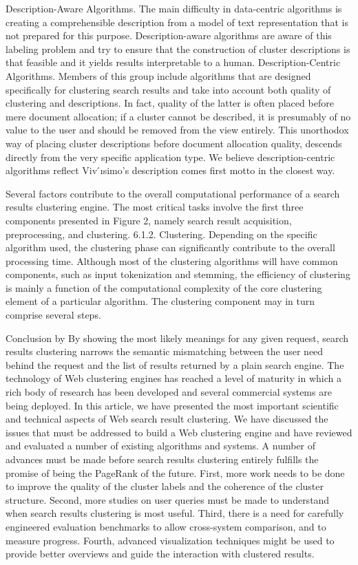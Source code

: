 \documentclass[runningheads]{llncs}
\begin{document}
Description-Aware Algorithms. The main difficulty in data-centric algorithms is creating a comprehensible description from a model of text representation that is not prepared for this purpose. Description-aware algorithms are aware of this labeling problem and try to ensure that the construction of cluster descriptions is that feasible and it yields results interpretable to a human.
Description-Centric Algorithms. Members of this group include algorithms that are designed specifically for clustering search results and take into account both quality of clustering and descriptions. In fact, quality of the latter is often placed before mere document allocation; if a cluster cannot be described, it is presumably of no value to the user and should be removed from the view entirely. This unorthodox way of placing cluster descriptions before document allocation quality, descends directly from the very specific application type. We believe description-centric algorithms reflect Viv ́ısimo’s description comes first motto in the closest way.

\cite{Carpineto} Several factors contribute to the overall computational performance of a search results clustering engine. The most critical tasks involve the first three components presented in Figure 2, namely search result acquisition, preprocessing, and clustering.
6.1.2. Clustering. Depending on the specific algorithm used, the clustering phase can significantly contribute to the overall processing time. Although most of the clustering algorithms will have common components, such as input tokenization and stemming, the efficiency of clustering is mainly a function of the computational complexity of the core clustering element of a particular algorithm. The clustering component may in turn comprise several steps.


Conclusion by \cite{Carpineto} By showing the most likely meanings for any given request, search results clustering narrows the semantic mismatching between the user need behind the request and the list of results returned by a plain search engine. The technology of Web clustering engines has reached a level of maturity in which a rich body of research has been developed and several commercial systems are being deployed.
In this article, we have presented the most important scientific and technical aspects of Web search result clustering. We have discussed the issues that must be addressed to build a Web clustering engine and have reviewed and evaluated a number of existing algorithms and systems.
A number of advances must be made before search results clustering entirely fulfills the promise of being the PageRank of the future. First, more work needs to be done to improve the quality of the cluster labels and the coherence of the cluster structure. Second, more studies on user queries must be made to understand when search results clustering is most useful. Third, there is a need for carefully engineered evaluation benchmarks to allow cross-system comparison, and to measure progress. Fourth, advanced visualization techniques might be used to provide better overviews and guide the interaction with clustered results.
\end{document}
